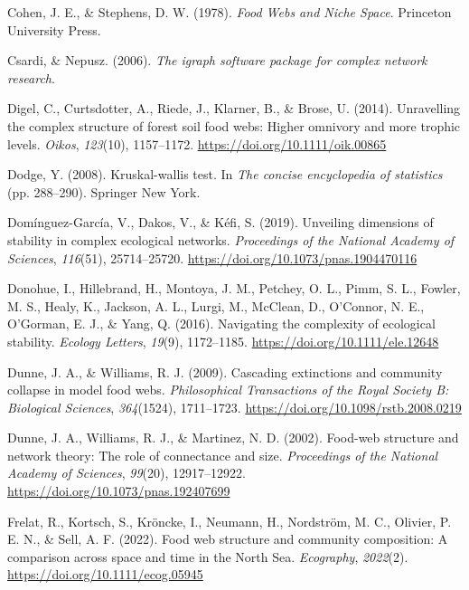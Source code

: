 \documentclass[
]{article}
\newlength{\cslhangindent}
\newlength{\cslentryspacingunit} %
\newenvironment{CSLReferences}[2] %
 {%
  \setlength{\parindent}{0pt}
  \ifodd #1
  \let\oldpar\par
  \def\par{\hangindent=\cslhangindent\oldpar}
  \fi
  \setlength{\parskip}{#2\cslentryspacingunit}
 }%
 {}
\begin{document}
\begin{CSLReferences}{1}{0}
\leavevmode{}%
Cohen, J. E., \& Stephens, D. W. (1978). \emph{Food {Webs} and {Niche
Space}}. {Princeton University Press}.

\leavevmode{}%
Csardi, \& Nepusz. (2006). \emph{The igraph software package for complex
network research}.

\leavevmode{}%
Digel, C., Curtsdotter, A., Riede, J., Klarner, B., \& Brose, U. (2014).
Unravelling the complex structure of forest soil food webs: Higher
omnivory and more trophic levels. \emph{Oikos}, \emph{123}(10),
1157--1172. \url{https://doi.org/10.1111/oik.00865}

\leavevmode{}%
Dodge, Y. (2008). Kruskal-wallis test. In \emph{The concise encyclopedia
of statistics} (pp. 288--290). {Springer New York}.

\leavevmode{}%
Domínguez-García, V., Dakos, V., \& Kéfi, S. (2019). Unveiling
dimensions of stability in complex ecological networks.
\emph{Proceedings of the National Academy of Sciences}, \emph{116}(51),
25714--25720. \url{https://doi.org/10.1073/pnas.1904470116}

\leavevmode{}%
Donohue, I., Hillebrand, H., Montoya, J. M., Petchey, O. L., Pimm, S.
L., Fowler, M. S., Healy, K., Jackson, A. L., Lurgi, M., McClean, D.,
O'Connor, N. E., O'Gorman, E. J., \& Yang, Q. (2016). Navigating the
complexity of ecological stability. \emph{Ecology Letters},
\emph{19}(9), 1172--1185. \url{https://doi.org/10.1111/ele.12648}

\leavevmode{}%
Dunne, J. A., \& Williams, R. J. (2009). Cascading extinctions and
community collapse in model food webs. \emph{Philosophical Transactions
of the Royal Society B: Biological Sciences}, \emph{364}(1524),
1711--1723. \url{https://doi.org/10.1098/rstb.2008.0219}

\leavevmode{}%
Dunne, J. A., Williams, R. J., \& Martinez, N. D. (2002). Food-web
structure and network theory: {The} role of connectance and size.
\emph{Proceedings of the National Academy of Sciences}, \emph{99}(20),
12917--12922. \url{https://doi.org/10.1073/pnas.192407699}

\leavevmode{}%
Frelat, R., Kortsch, S., Kröncke, I., Neumann, H., Nordström, M. C.,
Olivier, P. E. N., \& Sell, A. F. (2022). Food web structure and
community composition: A comparison across space and time in the {North
Sea}. \emph{Ecography}, \emph{2022}(2).
\url{https://doi.org/10.1111/ecog.05945}


\end{CSLReferences}
\end{document}
